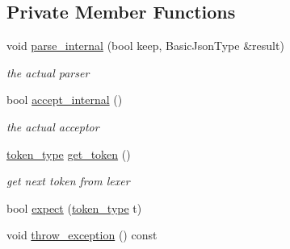 \subsection*{Private Member Functions}
\begin{DoxyCompactItemize}
\item 
void \hyperlink{classnlohmann_1_1detail_1_1parser_ace714b4bfb791f97050e0b380d2b50c3}{parse\+\_\+internal} (bool keep, Basic\+Json\+Type \&result)
\begin{DoxyCompactList}\small\item\em the actual parser \end{DoxyCompactList}\item 
bool \hyperlink{classnlohmann_1_1detail_1_1parser_ae74703484283dbb328277a6f8c559bf8}{accept\+\_\+internal} ()
\begin{DoxyCompactList}\small\item\em the actual acceptor \end{DoxyCompactList}\item 
\hyperlink{classnlohmann_1_1detail_1_1parser_a21d247111b332785b7acf3f8e487d117}{token\+\_\+type} \hyperlink{classnlohmann_1_1detail_1_1parser_a33f3859d0dd402445b5859070fd24bab}{get\+\_\+token} ()
\begin{DoxyCompactList}\small\item\em get next token from lexer \end{DoxyCompactList}\item 
bool \hyperlink{classnlohmann_1_1detail_1_1parser_a9abcc7b005c70ee67ce669c398273516}{expect} (\hyperlink{classnlohmann_1_1detail_1_1parser_a21d247111b332785b7acf3f8e487d117}{token\+\_\+type} t)
\item 
void \hyperlink{classnlohmann_1_1detail_1_1parser_a9ff5745f2ba313e795d6568bae6dddb8}{throw\+\_\+exception} () const
\end{DoxyCompactItemize}
